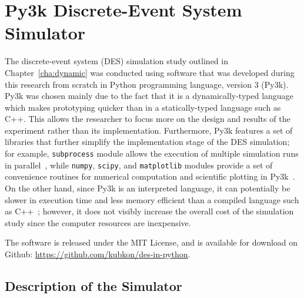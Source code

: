 \chapter{Py3k Discrete-Event System Simulator}
\label{cha:py3k_discrete_event_system_simulator}

\minitoc
\vspace{10mm}

The discrete-event system (DES) simulation study outlined in Chapter~\ref{cha:dynamic} was conducted using software that was developed during this research from scratch in Python programming language, version 3 (Py3k). Py3k was chosen mainly due to the fact that it is a dynamically-typed language which makes prototyping quicker than in a statically-typed language such as C++. This allows the researcher to focus more on the design and results of the experiment rather than its implementation. Furthermore, Py3k features a set of libraries that further simplify the implementation stage of the DES simulation; for example, \lstinline{subprocess} module allows the execution of multiple simulation runs in parallel~\cite{Py3kSubprocess}, while \lstinline{numpy}, \lstinline{scipy}, and \lstinline{matplotlib} modules provide a set of convenience routines for numerical computation and scientific plotting in Py3k~\cite{Numpy, Scipy, Matplotlib}. On the other hand, since Py3k is an interpreted language, it can potentially be slower in execution time and less memory efficient than a compiled language such as C++~\cite{Py3kC++}; however, it does not visibly increase the overall cost of the simulation study since the computer resources are inexpensive.

The software is released under the MIT License, and is available for download on Github: \url{https://github.com/kubkon/des-in-python}.

\section{Description of the Simulator}
\label{sec:description_of_the_simulator_simappendix}

